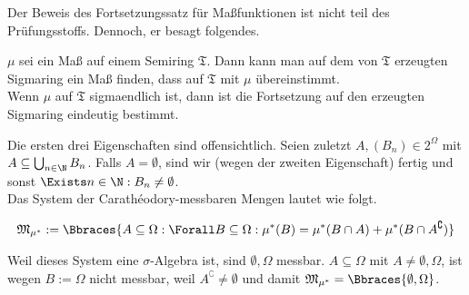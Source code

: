 \begin{solution}
\begin{itemize}
\end{itemize}

Der Beweis des Fortsetzungssatz für Maßfunktionen ist nicht teil des Prüfungsstoffs. Dennoch, er besagt folgendes.

\begin{theorem*}

$\mu$ sei ein Maß auf einem Semiring $\mathfrak{T}$. Dann kann man auf dem von $\mathfrak{T}$ erzeugten Sigmaring ein Maß finden, dass auf $\mathfrak{T}$ mit $\mu$ übereinstimmt. \\
Wenn $\mu$ auf $\mathfrak{T}$ sigmaendlich ist, dann ist die Fortsetzung auf den erzeugten Sigmaring eindeutig bestimmt.

\end{theorem*}

Die ersten drei Eigenschaften sind offensichtlich. Seien zuletzt $A, (B_n) \in 2^\Omega$ mit $A \subseteq \bigcup_{n \in \N} B_n$. Falls $A = \emptyset$, sind wir (wegen der zweiten Eigenschaft) fertig und sonst $\Exists n \in \N: B_n \neq \emptyset$. \\

Das System der Carathéodory-messbaren Mengen lautet wie folgt.

\begin{align*}
  \mathfrak{M}_{\mu^\ast} :=
  \Bbraces
  {
    A \subseteq \Omega:
    \Forall B \subseteq \Omega:
    \mu^\ast(B) = \mu^\ast(B \cap A) + \mu^\ast(B \cap A^\complement)
  }
\end{align*}

Weil dieses System eine $\sigma$-Algebra ist, sind $\emptyset, \Omega$ messbar. $A \subseteq \Omega$ mit $A \neq \emptyset, \Omega$, ist wegen $B := \Omega$ nicht messbar, weil $A^\complement \neq \emptyset$ und damit $\mathfrak{M}_{\mu^\ast} = \Bbraces{\emptyset, \Omega}$.

\end{solution}
